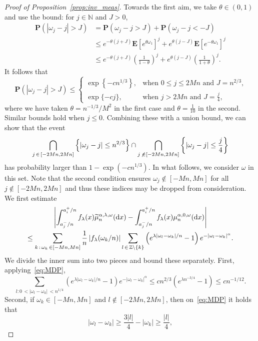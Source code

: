 \documentclass[AHL,Unicode,longabstracts,published]{cedram}
\newcommand{\N}{\mathbb N}
\newcommand{\Z}{\mathbb Z}
\newcommand{\bfP}{\mathbf{P}}
\newcommand{\bfE}{\mathbf{E}}
\newcommand{\dd}{\text{\upshape{d}}}
\let\oldtilde\tilde
\renewcommand*{\tilde}[1]{\mathchoice{\widetilde{#1}}{\widetilde{#1}}{\oldtilde{#1}}{\oldtilde{#1}}}
\begin{document}
\begin{proof}[Proof of Proposition~\ref{prop:inv_meas}]
Towards the first aim, we take $\theta\in (0,1)$ and use the bound: for $j\in\N$ and $J>0$,
\begin{align*}
\bfP(|\omega_j-j|>J) &= \bfP(\omega_j-j>J)+\bfP(\omega_j-j<-J)\\
&\le e^{-\theta(j+J)}\bfE\left[e^{\theta\omega_1}\right]^j+e^{\theta(j-J)}\bfE\left[e^{-\theta\omega_1}\right]^j\\
&\le e^{-\theta(j+J)}\left(\frac{1}{1-\theta}\right)^j+e^{\theta(j-J)}\left(\frac{1}{1+\theta}\right)^j.
\end{align*}
It follows that
\[
\bfP(|\omega_j-j|>J) \le
\begin{cases}
\exp\left\{-cn^{1/3}\right\}, & \text{when $0\leq j \le 2Mn$ and $J=n^{2/3}$,} \\
\exp\{-cj\}, & \text{when $j > 2Mn$ and $J=\frac{j}{4}$,}
\end{cases}
\]
where we have taken $\theta=n^{-1/3}/M^2$ in the first case and $\theta=\frac{1}{10}$ in the second. Similar bounds hold when $j\leq 0$. Combining these with a union bound, we can show that the event
\begin{align}\label{eq:MDP}
\bigcap_{j\,\in\,[-2Mn, 2Mn]}\left\{|\omega_j-j| \le n^{2/3}\right\}\cap \bigcap_{j\,\not\,\in[-2Mn, 2Mn]}\left\{|\omega_j-j| \le \frac{j}{4}\right\}
\end{align}
has probability larger than $1-\exp(-cn^{1/3})$. In what follows, we consider $\omega$ in this set. Note that the second condition ensures $\omega_j \not\in [-Mn,Mn]$ for all $j\not\in[-2Mn, 2Mn]$ and thus these indices may be dropped from consideration. We first estimate
\begin{multline}\label{eq:mu(f)}
\left|\int_{a_j^-/n}^{a_i^+/n} f_\lambda(x)\tilde{\mu}_n^{\alpha,\lambda,\omega}(\dd x) -\int_{a_j^-/n}^{a_i^+/n} f_\lambda(x)\mu_n^{\alpha,0,\omega}(\dd x)\right|\\
\le \sum_{k\,:\,\omega_k\,\in[-Mn,Mn]}\frac{1}{n}\left|f_\lambda(\omega_k/n)\right|\sum_{l\,\in\,\Z\setminus\{k\}}\left(e^{\lambda|\omega_l-\omega_k|/n}-1\right)e^{-\left|\omega_l-\omega_k\right|^\alpha}.
\end{multline}
We divide the inner sum into two pieces and bound these separately. First, applying~\eqref{eq:MDP},
\[
\sum_{l\colon 0\,<|\omega_l-\omega_k|\,<n^{1/4}}\left(e^{\lambda|\omega_l-\omega_k|/n}-1\right)e^{-|\omega_l-\omega_k|^\alpha}\le c n^{2/3} \left(e^{\lambda n^{-3/4}}-1\right) \le c n^{-1/12}.
\]
Second, if $\omega_k\in[-Mn,Mn]$ and $l\not\in[-2Mn, 2Mn]$, then on~\eqref{eq:MDP} it holds that
\[
\left|\omega_l-\omega_k\right|\geq \frac{3|l|}{4}-|\omega_k|\geq \frac{|l|}{4},
\]
\end{proof}
\end{document}
